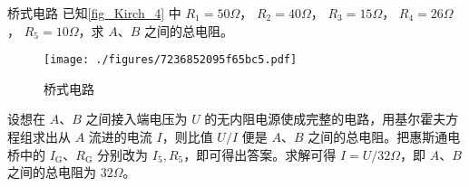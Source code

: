\begin{example}{桥式电路}
已知\autoref{fig_Kirch_4} 中 $R_{1}=50 \Omega$， $ R_{2}=40 \Omega$， $ R_{3}=15 \Omega$， $ R_{4}=26 \Omega$， $ R_{5}=10 \Omega$，求 $A $、$B $ 之间的总电阻。
\begin{figure}[ht]
\centering
\texttt{[image: ./figures/7236852095f65bc5.pdf]}
\caption{桥式电路} \label{fig_Kirch_4}
\end{figure}

设想在 $A $、$B $ 之间接入端电压为 $U $ 的无内阻电源使成完整的电路，用基尔霍夫方程组求出从 $A $ 流进的电流 $I$，则比值 $U/I$ 便是 $A$、$B$ 之间的总电阻。把惠斯通电桥中的 $I_\mathrm{G}$、$R_\mathrm{G}$ 分别改为 $I_5,R_5$，即可得出答案。求解可得 $I=U/32\Omega$，即 $A$、$B$ 之间的总电阻为 $32\Omega$。
\end{example}
